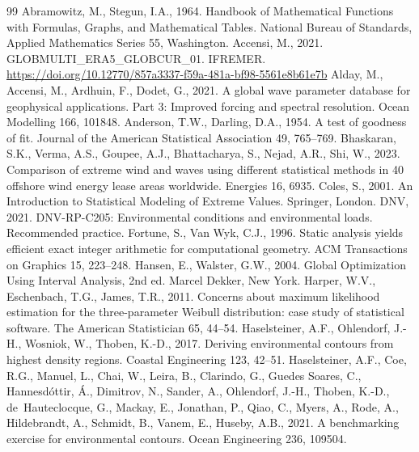 \documentclass[preprint,11pt,authoryear]{elsarticle}
\begin{document}
\begin{thebibliography}{99}
 Abramowitz, M., Stegun, I.A., 1964. Handbook of Mathematical Functions with Formulas, Graphs, and Mathematical Tables. National Bureau of Standards, Applied Mathematics Series 55, Washington.
 Accensi, M., 2021. GLOBMULTI\_ERA5\_GLOBCUR\_01. IFREMER. \url{https://doi.org/10.12770/857a3337-f59a-481a-bf98-5561e8b61e7b}
 Alday, M., Accensi, M., Ardhuin, F., Dodet, G., 2021. A global wave parameter database for geophysical applications. Part 3: Improved forcing and spectral resolution. Ocean Modelling 166, 101848.
 Anderson, T.W., Darling, D.A., 1954. A test of goodness of fit. Journal of the American Statistical Association 49, 765--769.
 Bhaskaran, S.K., Verma, A.S., Goupee, A.J., Bhattacharya, S., Nejad, A.R., Shi, W., 2023. Comparison of extreme wind and waves using different statistical methods in 40 offshore wind energy lease areas worldwide. Energies 16, 6935.
 Coles, S., 2001. An Introduction to Statistical Modeling of Extreme Values. Springer, London.
 DNV, 2021. DNV-RP-C205: Environmental conditions and environmental loads. Recommended practice.
 Fortune, S., Van Wyk, C.J., 1996. Static analysis yields efficient exact integer arithmetic for computational geometry. ACM Transactions on Graphics 15, 223--248.
 Hansen, E., Walster, G.W., 2004. Global Optimization Using Interval Analysis, 2nd ed. Marcel Dekker, New York.
 Harper, W.V., Eschenbach, T.G., James, T.R., 2011. Concerns about maximum likelihood estimation for the three-parameter Weibull distribution: case study of statistical software. The American Statistician 65, 44--54.
 Haselsteiner, A.F., Ohlendorf, J.-H., Wosniok, W., Thoben, K.-D., 2017. Deriving environmental contours from highest density regions. Coastal Engineering 123, 42--51.
 Haselsteiner, A.F., Coe, R.G., Manuel, L., Chai, W., Leira, B., Clarindo, G., Guedes Soares, C., Hannesd\'ottir, \'A., Dimitrov, N., Sander, A., Ohlendorf, J.-H., Thoben, K.-D., de~Hauteclocque, G., Mackay, E., Jonathan, P., Qiao, C., Myers, A., Rode, A., Hildebrandt, A., Schmidt, B., Vanem, E., Huseby, A.B., 2021. A benchmarking exercise for environmental contours. Ocean Engineering 236, 109504.

\end{thebibliography}
\end{document}
